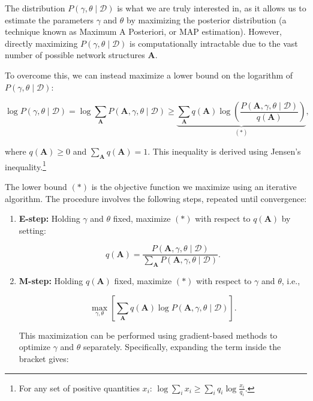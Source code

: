 {The distribution \(P(\gamma, \theta \mid \mathcal{D})\) is what we are truly interested in, as it allows us to estimate the parameters \(\gamma\) and \(\theta\) by maximizing the posterior distribution (a technique known as Maximum A Posteriori, or MAP estimation). However, directly maximizing \(P(\gamma, \theta \mid \mathcal{D})\) is computationally intractable due to the vast number of possible network structures \(\bm{A}\).

To overcome this, we can instead maximize a lower bound on the logarithm of \(P(\gamma, \theta \mid \mathcal{D})\):

\begin{equation}
    \log P(\gamma, \theta \mid \mathcal{D}) = \log \sum_{\bm{A}}{P(\bm{A}, \gamma, \theta \mid \mathcal{D})} \ge 
    \underbrace{\sum_{\bm{A}}{q(\bm{A}) \log \left( \frac{P(\bm{A}, \gamma, \theta \mid \mathcal{D})}{q(\bm{A})} \right)}}_{(\ast)},
\end{equation}

where \(q(\bm{A}) \geq 0\) and \(\sum_{\bm{A}}{q(\bm{A})} = 1\). This inequality is derived using Jensen's inequality.\footnote{For any set of positive quantities \(x_i\): \(\log \sum_{i}{x_i} \geq \sum_{i}{q_i \log \frac{x_i}{q_i}}\).}

The lower bound \((\ast)\) is the objective function we maximize using an iterative algorithm. The procedure involves the following steps, repeated until convergence:

\begin{enumerate}
    \item \textbf{E-step:} Holding \(\gamma\) and \(\theta\) fixed, maximize \((\ast)\) with respect to \(q(\bm{A})\) by setting:
    
    \begin{equation}
        q(\bm{A}) = \frac{P(\bm{A}, \gamma, \theta \mid \mathcal{D})}{\sum_{\bm{A}}{P(\bm{A}, \gamma, \theta \mid \mathcal{D})}}.
    \end{equation}
    
    \item \textbf{M-step:} Holding \(q(\bm{A})\) fixed, maximize \((\ast)\) with respect to \(\gamma\) and \(\theta\), i.e.,

    \begin{equation}
        \max_{\gamma, \theta}\left[ \sum_{\bm{A}}{
            q(\bm{A}) \log P(\bm{A}, \gamma, \theta \mid \mathcal{D})
        } \right].
    \end{equation}

    This maximization can be performed using gradient-based methods to optimize \(\gamma\) and \(\theta\) separately. Specifically, expanding the term inside the bracket gives:


\end{enumerate}}

